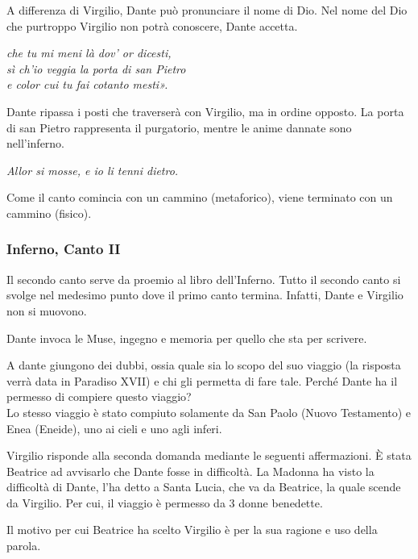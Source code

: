 \documentclass[a4paper]{article}
\begin{document}
A differenza di Virgilio, Dante può pronunciare il nome di Dio.
Nel nome del Dio che purtroppo Virgilio non potrà conoscere, Dante accetta.

\begin{center}
    \textit{che tu mi meni là dov' or dicesti,} \\
    \textit{sì ch'io veggia la porta di san Pietro} \\
    \textit{e color cui tu fai cotanto mesti».}
\end{center}

Dante ripassa i posti che traverserà con Virgilio, ma in ordine opposto.
La porta di san Pietro rappresenta il purgatorio, mentre le anime dannate
sono nell'inferno.

\begin{center}
    \textit{Allor si mosse, e io li tenni dietro.}
\end{center}

Come il canto comincia con un cammino (metaforico), viene terminato
con un cammino (fisico).

\pagebreak

\subsubsection{Inferno, Canto II}

Il secondo canto serve da proemio al libro dell'Inferno.
Tutto il secondo canto si svolge nel medesimo punto dove il primo canto termina.
Infatti, Dante e Virgilio non si muovono.

Dante invoca le Muse, ingegno e memoria per quello che sta per scrivere.

A dante giungono dei dubbi, ossia quale sia lo scopo del suo viaggio
(la risposta verrà data in Paradiso XVII) e chi gli permetta di fare tale.
Perché Dante ha il permesso di compiere questo viaggio?
\\
Lo stesso viaggio è stato compiuto solamente da San Paolo (Nuovo Testamento)
e Enea (Eneide), uno ai cieli e uno agli inferi.

Virgilio risponde alla seconda domanda mediante le seguenti affermazioni.
È stata Beatrice ad avvisarlo che Dante fosse in difficoltà.
La Madonna ha visto la difficoltà di Dante, l'ha detto a Santa Lucia, che va da Beatrice,
la quale scende da Virgilio.
Per cui, il viaggio è permesso da 3 donne benedette.
\begin{center}
\end{center}
Il motivo per cui Beatrice ha scelto Virgilio è per la sua ragione e uso della parola.
\end{document}
